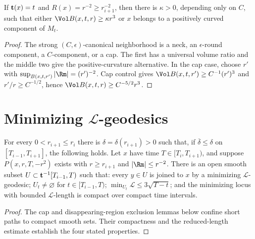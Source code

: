 \begin{proposition}
\label{prop:noncollapsing-small-scale-easy-case}
If ${\bf t}(x)=t$ and $R(x)=r^{-2}\geq r_{i+1}^{-2}$, then there is $\kappa>0$, depending only on $C$, such that either $\Vol B(x,t,r)\geq\kappa r^3$ or $x$ belongs to a positively curved component of $M_t$.
\end{proposition}
\begin{proof}
\sketch The strong $(C,\epsilon)$-canonical neighborhood is a neck, an $\epsilon$-round component, a $C$-component, or a cap. The first has a universal volume ratio and the middle two give the positive-curvature alternative. In the cap case, choose $r'$ with $\sup_{B(x,t,r')}|\Rm|=(r')^{-2}$. Cap control gives $\Vol B(x,t,r')\geq C^{-1}(r')^3$ and $r'/r\geq C^{-1/2}$, hence $\Vol B(x,t,r)\geq C^{-5/2}r^3$.
\end{proof}

\section{Minimizing $\mathcal L$-geodesics}

\begin{proposition}
\label{prop:minimizing-L-geodesics-exist}
\label{delta0ri+1}
For every $0<r_{i+1}\leq r_i$ there is $\delta=\delta(r_{i+1})>0$ such that, if $\overline\delta\leq\delta$ on $[T_{i-1},T_{i+1}]$, the following holds. Let $x$ have time $T\in[T_i,T_{i+1})$, and suppose $P(x,r,T,-r^2)$ exists with $r\geq r_{i+1}$ and $|\Rm|\leq r^{-2}$. There is an open smooth subset $U\subset{\bf t}^{-1}[T_{i-1},T)$ such that: every $y\in U$ is joined to $x$ by a minimizing $\mathcal L$-geodesic; $U_t\ne\varnothing$ for $t\in[T_{i-1},T)$; $\min_{U_t}\mathcal L\leq3\sqrt{T-t}$; and the minimizing locus with bounded $\mathcal L$-length is compact over compact time intervals.
\end{proposition}
\begin{proof}
\sketch
{}
The cap and disappearing-region exclusion lemmas below confine short paths to compact smooth sets. Their compactness and the reduced-length estimate establish the four stated properties.
\end{proof}

